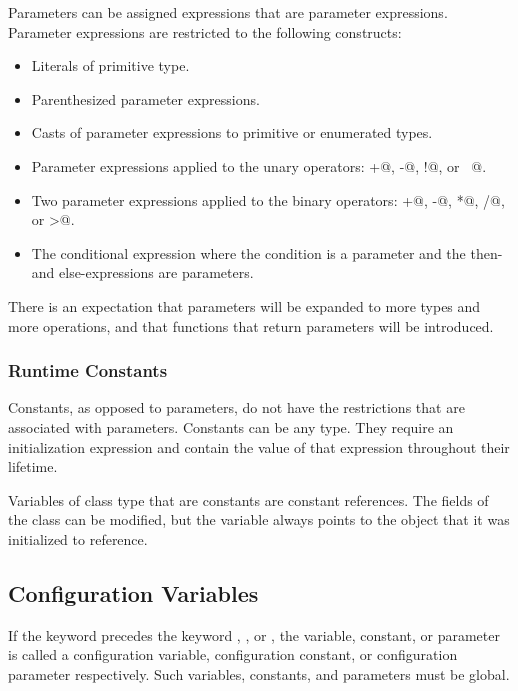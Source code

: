Parameters can be assigned expressions that are parameter expressions.
Parameter expressions are restricted to the following constructs:
\begin{itemize}
\item
 Literals of primitive type.
\item
 Parenthesized parameter expressions.
\item
 Casts of parameter expressions to primitive or enumerated types.
\item
 Parameter expressions applied to the unary
 operators: \verb@+@, \verb@-@, \verb@!@, or \verb@~@.
\item
 Two parameter expressions applied to the binary
 operators: \verb@+@, \verb@-@, \verb@*@, \verb@/@, \verb@%@, \verb@**@, \verb@&&@, \verb@||@, \verb@!@, \verb@&@, \verb@|@, \verb@^@, \verb@~@, \verb@<<@, \verb@>>@, \verb@==@, \verb@!=@, \verb@<=@, \verb@>=@, \verb@<@,
 or \verb@>@.
\item
 The conditional expression where the condition is a parameter and the
 then- and else-expressions are parameters.
\end{itemize}

There is an expectation that parameters will be expanded to more types
and more operations, and that functions that return parameters will be
introduced.

\subsubsection{Runtime Constants}
\label{Runtime_Constants}

Constants, as opposed to parameters, do not have the restrictions that
are associated with parameters.  Constants can be any type.  They
require an initialization expression and contain the value of that
expression throughout their lifetime.

Variables of class type that are constants are constant references.
The fields of the class can be modified, but the variable always
points to the object that it was initialized to reference.

\subsection{Configuration Variables}
\label{Configuration_Variables}

If the keyword  precedes the
keyword , , or , the variable,
constant, or parameter is called a configuration variable,
configuration constant, or configuration parameter respectively.  Such
variables, constants, and parameters must be global.

